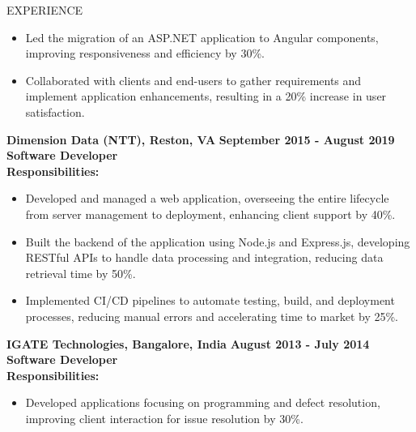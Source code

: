 \documentclass{resume} %
\begin{document}
\begin{rSection}{EXPERIENCE}
\begin{flushleft}
\begin{itemize}
                                    \item Led the migration of an ASP.NET application to Angular components, improving responsiveness and efficiency by 30\%.
                                    \item Collaborated with clients and end{-}users to gather requirements and implement application enhancements, resulting in a 20\% increase in user satisfaction.
                            \end{itemize}
            \vspace{0.5em}
            \textbf{Dimension Data (NTT), Reston, VA} \hfill \textbf{September 2015 {-} August 2019} \\
            \textbf{Software Developer} \\
            \vspace{1em}
            \textbf{Responsibilities:} \\
            \begin{itemize}
                                    \item Developed and managed a web application, overseeing the entire lifecycle from server management to deployment, enhancing client support by 40\%.
                                    \item Built the backend of the application using Node.js and Express.js, developing RESTful APIs to handle data processing and integration, reducing data retrieval time by 50\%.
                                    \item Implemented CI/CD pipelines to automate testing, build, and deployment processes, reducing manual errors and accelerating time to market by 25\%.
                            \end{itemize}
            \vspace{0.5em}
            \textbf{IGATE Technologies, Bangalore, India} \hfill \textbf{August 2013 {-} July 2014} \\
            \textbf{Software Developer} \\
            \vspace{1em}
            \textbf{Responsibilities:} \\
            \begin{itemize}
                                    \item Developed applications focusing on programming and defect resolution, improving client interaction for issue resolution by 30\%.

\end{itemize}
\end{flushleft}
\end{rSection}
\end{document}
